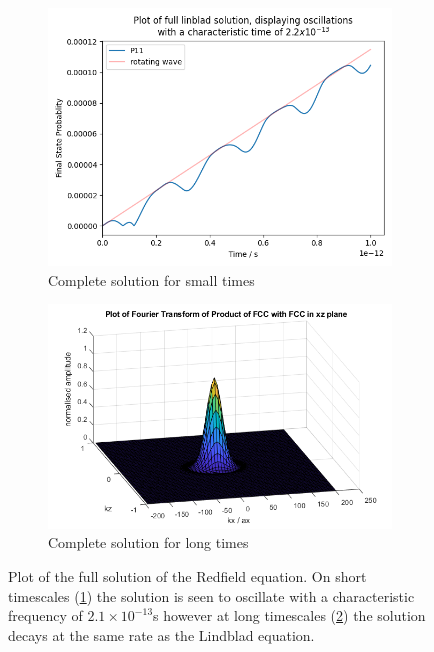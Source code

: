 \begin{figure}[htb]
  \centering
  \begin{subfigure}{0.45\linewidth}
    \centering
    \includegraphics[width =0.9 \linewidth]{Figures/Redfield/Plot of redfield solution short time.png}
    \caption{Complete solution for small times
    }\label{fig:redfield full solution short timescales}
  \end{subfigure}
  \hfill
  \begin{subfigure}{0.45\linewidth}
    \centering
    \includegraphics[width = 0.9\linewidth]{Figures/Model/Plot of fourier transform of the wavefunction fccfcc xz plane.png}
    \caption{Complete solution for long times
    }\label{fig:redfield full solution long timescales}
  \end{subfigure}
  \caption{Plot of the full solution of the Redfield
  equation. On short timescales
  (\cref{fig:redfield full solution short timescales})
  the solution is seen to
  oscillate with a characteristic
  frequency of \(2.1\times{}10^{-13}\)s however
  at long timescales (\cref{fig:redfield full solution long timescales})
  the solution decays at the same rate as the
  Lindblad equation.}\label{fig:redfield full solution}
\end{figure}

